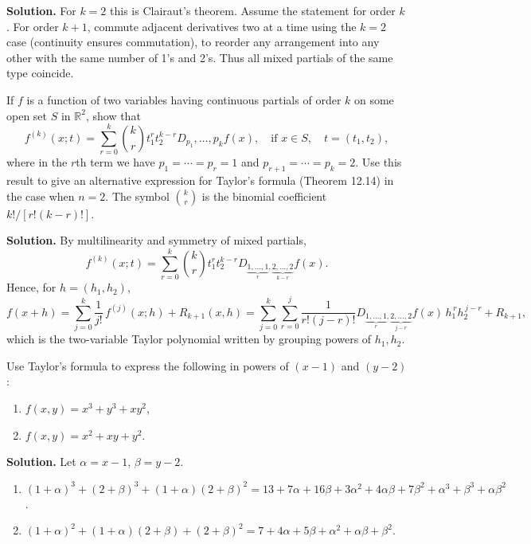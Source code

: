\noindent\textbf{Solution.}
For $k=2$ this is Clairaut's theorem. Assume the statement for order $k$. For order $k+1$, commute adjacent derivatives two at a time using the $k=2$ case (continuity ensures commutation), to reorder any arrangement into any other with the same number of 1's and 2's. Thus all mixed partials of the same type coincide.

\begin{problembox}
If \( f \) is a function of two variables having continuous partials of order \( k \) on some open set \( S \) in \( \mathbb{R}^2 \), show that
\[f^{(k)} (x; t) = \sum_{r=0}^{k} \binom{k}{r} t_1^r t_2^{k-r} D_{p_1}, \ldots, p_k f(x), \quad \text{if } x \in S, \quad t = (t_1, t_2),\]
where in the \( r \)th term we have \( p_1 = \cdots = p_r = 1 \) and \( p_{r+1} = \cdots = p_k = 2 \). Use this result to give an alternative expression for Taylor's formula (Theorem 12.14) in the case when \( n = 2 \). The symbol \( \binom{k}{r} \) is the binomial coefficient \( k! / [r! (k - r)!] \).
\end{problembox}

\noindent\textbf{Solution.}
By multilinearity and symmetry of mixed partials,
\[f^{(k)}(x;t)=\sum_{r=0}^k \binom{k}{r} t_1^r t_2^{k-r} D_{\underbrace{1,\dots,1}_{r},\underbrace{2,\dots,2}_{k-r}} f(x).\]
Hence, for $h=(h_1,h_2)$,
\[f(x+h)=\sum_{j=0}^k \frac{1}{j!}\,f^{(j)}(x;h)+R_{k+1}(x,h)=\sum_{j=0}^k\sum_{r=0}^j \frac{1}{r!(j-r)!} D_{\!\underbrace{1,\dots,1}_{r},\underbrace{2,\dots,2}_{j-r}} f(x)\,h_1^{\,r} h_2^{\,j-r}+R_{k+1},\]
which is the two-variable Taylor polynomial written by grouping powers of $h_1,h_2$.

\begin{problembox}
Use Taylor's formula to express the following in powers of \( (x - 1) \) and \( (y - 2) \):
\begin{enumerate}[label=(\alph*)]
\item \( f(x, y) = x^3 + y^3 + xy^2 \),
\item \( f(x, y) = x^2 + xy + y^2 \).
\end{enumerate}
\end{problembox}

\noindent\textbf{Solution.}
Let $\alpha=x-1$, $\beta=y-2$.
\begin{enumerate}[label=(\alph*)]
\item $(1+\alpha)^3+(2+\beta)^3+(1+\alpha)(2+\beta)^2=13+7\alpha+16\beta+3\alpha^2+4\alpha\beta+7\beta^2+\alpha^3+\beta^3+\alpha\beta^2$.
\item $(1+\alpha)^2+(1+\alpha)(2+\beta)+(2+\beta)^2=7+4\alpha+5\beta+\alpha^2+\alpha\beta+\beta^2$.
\end{enumerate}